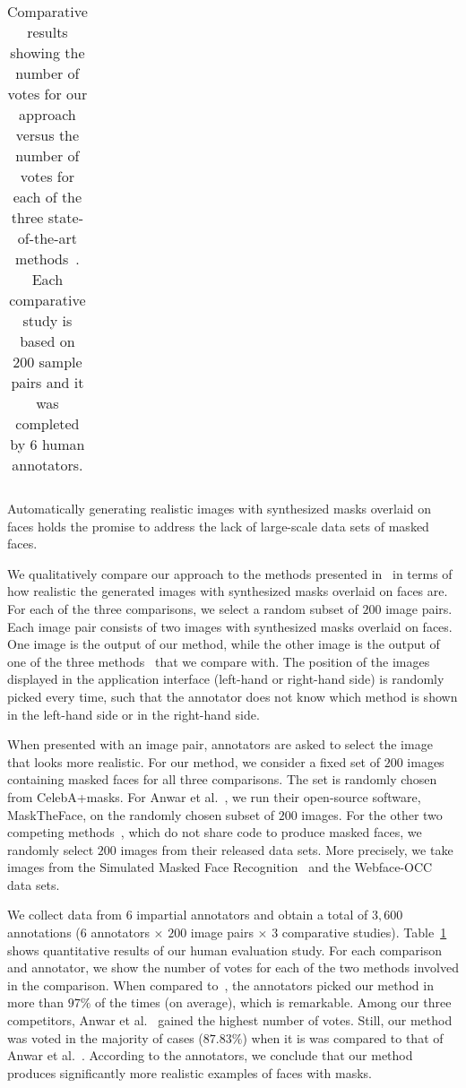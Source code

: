 \documentclass{article}
\begin{document}
\begin{table}
\begin{center}
\begin{tabular}{|l|c|c|c|}
\hline
\end{tabular}
\end{center}
\caption{Comparative results showing the number of votes for our approach versus the number of votes for each of the three state-of-the-art methods~\cite{wang2020arxiv,anwar2020arxiv,huang2021icassp}. Each comparative study is based on $200$ sample pairs and it was completed by $6$ human annotators.} 
\label{tab:quality_assessment}
\end{table} 

Automatically generating realistic images with synthesized masks overlaid on faces holds the promise to address the lack of large-scale data sets of masked faces.


We qualitatively compare our approach to the methods presented in~\cite{wang2020arxiv, anwar2020arxiv, huang2021icassp} in terms of how realistic the generated images with synthesized masks overlaid on faces are. For each of the three comparisons, we select a random subset of $200$ image pairs. Each image pair consists of two images with synthesized masks overlaid on faces. One image is the output of our method, while the other image is the output of one of the three methods~\cite{wang2020arxiv, anwar2020arxiv, huang2021icassp} that we compare with. The position of the images displayed in the application interface (left-hand or right-hand side) is randomly picked every time, such that the annotator does not know which method is shown in the left-hand side or in the right-hand side. 

When presented with an image pair, annotators are asked to select the image that looks more realistic. 
For our method, we consider a fixed set of $200$ images containing masked faces for all three comparisons. The set is randomly chosen from {CelebA+masks}. For Anwar et al.~\cite{anwar2020arxiv}, we run their open-source software, MaskTheFace, on the randomly chosen subset of $200$ images. For the other two competing methods~\cite{wang2020arxiv,huang2021icassp}, which do not share code to produce masked faces, we randomly select $200$ images from their released data sets. 
More precisely, we take images from the Simulated Masked Face Recognition~\cite{wang2020arxiv} and the Webface-OCC~\cite{huang2021icassp} data sets.



We collect data from $6$ impartial annotators and obtain a total of $3,600$ annotations ($6$ annotators $\times$ $200$ image pairs $\times$ $3$ comparative studies). Table~\ref{tab:quality_assessment} shows quantitative results of our human evaluation study. For each comparison and annotator, we show the number of votes for each of the two methods involved in the comparison.
When compared to~\cite{wang2020arxiv,huang2021icassp}, the annotators picked our method in more than $97\%$ of the times (on average), which is remarkable. Among our three competitors, Anwar et al.~\cite{anwar2020arxiv} gained the highest number of votes. Still, our method was voted in the majority of cases ($87.83\%$) when it is was compared to that of Anwar et al.~\cite{anwar2020arxiv}. According to the annotators, we conclude that our method produces significantly more realistic examples of faces with masks.
\end{document}
